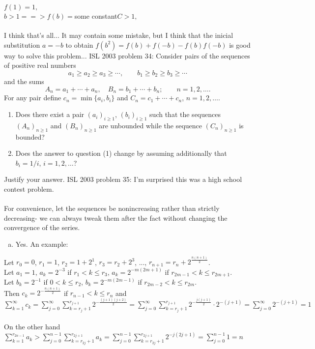 $f(1)=1,$ \\
$b>1     ==>     f(b) = $some constant$ C > 1,$ \\\\
I think that's all... It may contain some mistake, but I think that the inicial substitution $a = -b$ to obtain $f(b^2) = f(b) + f(-b) - f(b)f(-b)$ is good way to solve this problem... 
ISL 2003 problem 34:  Consider pairs of the sequences of positive real numbers
\[ a_1\geq a_2\geq a_3\geq\cdots,\qquad b_1\geq b_2\geq b_3\geq\cdots \]
and the sums
\[ A_n = a_1 + \cdots + a_n,\quad B_n = b_1 + \cdots + b_n;\qquad n = 1,2,\ldots. \]
For any pair define $c_n = \min\{a_i,b_i\}$ and $C_n = c_1 + \cdots + c_n$, $n=1,2,\ldots$.
\begin{enumerate}[(1)]
  \item Does there exist a pair $(a_i)_{i\geq 1}$, $(b_i)_{i\geq 1}$ such that the sequences $(A_n)_{n\geq 1}$ and $(B_n)_{n\geq 1}$ are unbounded while the sequence $(C_n)_{n\geq 1}$ is bounded?
  \item Does the answer to question (1) change by assuming additionally that $b_i = 1/i$, $i=1,2,\ldots$?
\end{enumerate}
Justify your answer. 
ISL 2003 problem 35:  I'm surprised this was a high school contest problem. \\\\
For convenience, let the sequences be nonincreasing rather than strictly decreasing- we can always tweak them after the fact without changing the convergence of the series.
\begin{enumerate}[(a)]
  \item Yes. An example:
\end{enumerate}
Let $r_0=0$, $r_1=1$, $r_2=1+2^1$, $r_3=r_2+2^3$, ..., $r_{n+1}=r_n+2^{\frac{n(n+1)}{2}}$. \\
Let $a_1=1$, $a_k=2^{-3}$ if $r_1<k \le r_3$, $a_k=2^{-m(2m+1)}$ if $r_{2m-1}< k \le r_{2m+1}$. \\
Let $b_k=2^{-1}$ if $0<k \le r_2$, $b_k=2^{-m(2m-1)}$ if $r_{2m-2}< k \le r_{2m}$. \\
Then $c_k=2^{-\frac{n(n+1)}{2}}$ if $r_{n-1}<k \le r_n$ and \\
$\displaystyle \sum_{k=1}^{\infty}c_k = \sum_{j=0}^{\infty} \sum_{k=r_j+1}^{r_{j+1}} 2^{-\frac{(j+1)(j+2)}{2}} = \sum_{j=0}^{\infty} \sum_{k=r_j+1}^{r_{j+1}} 2^{-\frac{j(j+1)}{2}}\cdot 2^{-(j+1)} = \sum_{j=0}^{\infty} 2^{-(j+1)} = 1$ \\\\
On the other hand $\displaystyle \sum_{k=1}^{r_{2n-1}}a_k > \sum_{j=0}^{n-1} \sum_{k=r_{2j}+1}^{r_{2j+1}}a_k = \sum_{j=0}^{n-1} \sum_{k=r_{2j}+1}^{r_{2j+1}}2^{-j(2j+1)} = \sum_{j=0}^{n-1} 1 = n$ \\
